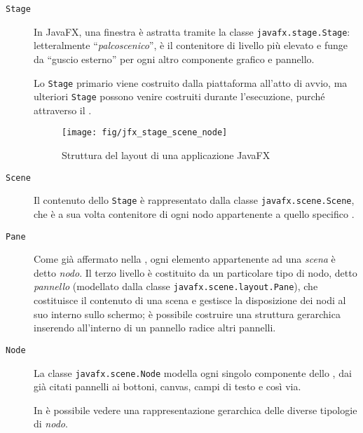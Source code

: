             \begin{description}
                \item[\texttt{Stage}]\label{itm:stg}
                    In JavaFX, una finestra è astratta tramite la classe \texttt{javafx\dothyp stage\dothyp Stage}:
                    letteralmente ``\emph{palcoscenico}'',  è il contenitore di livello più elevato e funge da ``guscio esterno'' per ogni altro componente grafico e pannello.

                    Lo \texttt{Stage} primario viene costruito dalla piattaforma all'atto di avvio, ma ulteriori \texttt{Stage} possono venire costruiti durante l'esecuzione, purché attraverso il .

                    \begin{figure}[htbp]
                        \centering
                        \texttt{[image: fig/jfx\_stage\_scene\_node]}
                        \caption{Struttura del layout di una applicazione JavaFX}
                        \label{fig:jfxStage}
                    \end{figure}

                \item[\texttt{Scene}]\label{itm:scn}
                    Il contenuto dello \texttt{Stage} è rappresentato dalla classe \texttt{javafx\dothyp scene\dothyp Scene}, che è a sua volta contenitore di ogni nodo appartenente a quello specifico .

                \item[\texttt{Pane}]\label{itm:pane}
                    Come già affermato nella , ogni elemento appartenente ad una \emph{scena} è detto \emph{nodo}.
                    Il terzo livello è costituito da un particolare tipo di nodo, detto \emph{pannello} (modellato dalla classe \texttt{javafx\dothyp scene\dothyp layout\dothyp Pane}), che costituisce il contenuto di una scena e gestisce la disposizione dei nodi al suo interno sullo schermo;
                    è possibile costruire una struttura gerarchica inserendo all'interno di un pannello radice altri pannelli.

                \item[\texttt{Node}]\label{itm:nod}
                    La classe \texttt{javafx\dothyp scene\dothyp Node} modella ogni singolo componente dello , dai già citati pannelli ai bottoni, canvas, campi di testo e così via.

                    In  è possibile vedere una rappresentazione gerarchica delle diverse tipologie di \emph{nodo}.
            \end{description}


